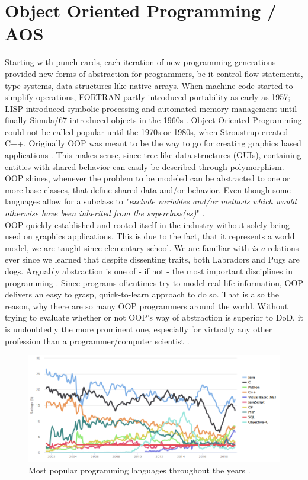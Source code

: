 \section{Object Oriented Programming / AOS}
Starting with punch cards, each iteration of new programming generations provided new forms of abstraction for programmers, be it control flow statements, type systems, data structures like native arrays. When machine code started to simplify operations, FORTRAN partly introduced portability as early as 1957; LISP introduced symbolic processing and automated memory management until finally Simula/67 introduced objects in the 1960s .
Object Oriented Programming could not be called popular until the 1970s or 1980s, when Stroustrup created C++. Originally OOP was meant to be the way to go for creating graphics based applications  . This makes sense, since tree like data structures (GUIs), containing entities with shared behavior can easily be described through polymorphism.\\
OOP shines, whenever the problem to be modeled can be abstracted to one or more base classes, that define shared data and/or behavior. Even though some languages allow for a subclass to "\textit{exclude variables and/or methods which would otherwise have been inherited from the superclass(es)}" .\\
OOP quickly established and rooted itself in the industry without solely being used on graphics applications. This is due to the fact, that it represents a world model, we are taught since elementary school. We are familiar with \textit{is-a} relations ever since we learned that despite dissenting traits, both Labradors and Pugs are dogs. Arguably abstraction is one of - if not - the most important disciplines in programming . Since programs oftentimes try to model real life information, OOP delivers an easy to grasp, quick-to-learn approach to do so. That is also the reason, why there are so many OOP programmers around the world. Without trying to evaluate whether or not OOP's way of abstraction is superior to DoD, it is undoubtedly the more prominent one, especially for virtually any other profession than a programmer/computer scientist .
\begin{figure}[!htbp]
	\centering
	\includegraphics[width=1.0\linewidth]{PICs/lang_ratings}
	\caption{Most popular programming languages throughout the years .}\label{lang_ratings}
\end{figure}
